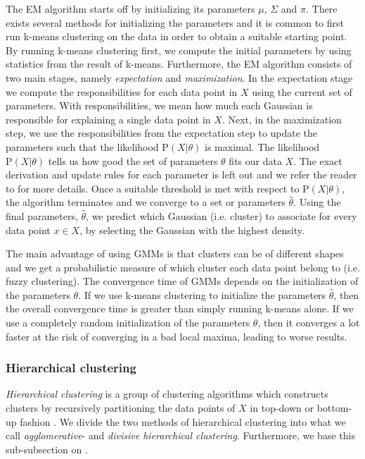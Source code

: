 The EM algorithm starts off by initializing its parameters $\mu$, $\Sigma$ and $\pi$. There exists several methods for initializing the parameters and it is common to first run k-means clustering on the data in order to obtain a suitable starting point. By running k-means clustering first, we compute the initial parameters by using statistics from the result of k-means. Furthermore, the EM algorithm consists of two main stages, namely \textit{expectation} and \textit{maximization}. In the expectation stage we compute the responsibilities for each data point in $X$ using the current set of parameters. With responsibilities, we mean how much each Gaussian is responsible for explaining a single data point in $X$. Next, in the maximization step, we use the responsibilities from the expectation step to update the parameters such that the likelihood $\text{P}(X | \theta)$ is maximal. The likelihood $\text{P}(X | \theta)$ tells us how good the set of parameters $\theta$ fits our data $X$. The exact derivation and update rules for each parameter is left out and we refer the reader to \cite[Section 9.4]{bishop2006} for more details. Once a suitable threshold is met with respect to $\text{P}(X | \theta)$, the algorithm terminates and we converge to a set or parameters $\hat{\theta}$. Using the final parameters, $\hat{\theta}$, we predict which Gaussian (i.e. cluster) to associate for every data point $x \in X$, by selecting the Gaussian with the highest density.

The main advantage of using GMMs is that clusters can be of different shapes and we get a probabilistic measure of which cluster each data point belong to (i.e. fuzzy clustering). The convergence time of GMMs depends on the initialization of the parameters $\theta$. If we use k-means clustering to initialize the parameters $\hat{\theta}$, then the overall convergence time is greater than simply running k-means alone. If we use a completely random initialization of the parameters $\theta$, then it converges a lot faster at the risk of converging in a bad local maxima, leading to worse results.

\subsubsection{Hierarchical clustering}
\label{sec:hierarchical-clustering}
\textit{Hierarchical clustering} is a group of clustering algorithms which constructs clusters by recursively partitioning the data points of $X$ in top-down or bottom-up fashion \cite{Rokach2005}. We divide the two methods of hierarchical clustering into what we call \textit{agglomerative}- and \textit{divisive hierarchical clustering}. Furthermore, we base this sub-subsection on \cite{Rokach2005}.

